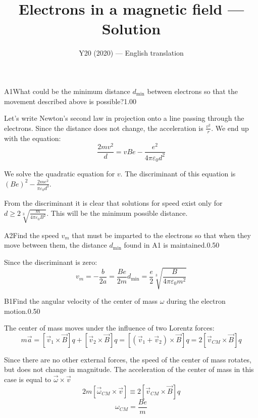 \documentclass[11pt,a4paper]{article}
\title{\textbf{Electrons in a magnetic field --- Solution}}
\author{\normalsize Y20 (2020) — English translation}
\date{}
\begin{document}
\maketitle\vspace{-0.5em}
\begin{solcard}{A1}{What could be the minimum distance $d_{\min}$ between electrons so that the movement described above is possible?}{1.00}

Let's write Newton's second law in projection onto a line passing through the electrons. Since the distance does not change, the acceleration is $\frac{v^2}{r}$. We end up with the equation: $$ \frac{2mv^2}{d}=vBe-\frac{e^2}{4\pi\varepsilon_0 d^2} $$


We solve the quadratic equation for $v$. The discriminant of this equation is $(Be)^2-\frac{2me^2}{\pi\varepsilon_0d^3}$.


From the discriminant it is clear that solutions for speed exist only for $d\geqslant2\sqrt[3]{\frac{m}{4\pi\varepsilon_0 B^2}}$. This will be the minimum possible distance.

\end{solcard}

\begin{solcard}{A2}{Find the speed $v_m$ that must be imparted to the electrons so that when they move between them, the distance $d_{\min}$ found in A1 is maintained.}{0.50}

Since the discriminant is zero: $$v_m = -\frac{b}{2a}= \frac{Be}{2m}d_{\text{min}}=\frac{e}{2}\sqrt[3]{\frac{B}{4\pi\varepsilon_0m^2}}$$

\end{solcard}

\begin{solcard}{B1}{Find the angular velocity of the center of mass $\omega$ during the electron motion.}{0.50}

The center of mass moves under the influence of two Lorentz forces: $$m\vec{a} = \left[\vec{v}_1\times \vec B\right]q+\left[\vec{v}_2\times \vec B\right]q = \left[\left(\vec{v}_1+\vec{v}_2\right)\times \vec B\right]q = 2\left[\vec{v}_{CM}\times \vec B\right]q$$


Since there are no other external forces, the speed of the center of mass rotates, but does not change in magnitude. The acceleration of the center of mass in this case is equal to $\vec\omega\times\vec v$ $$2m\left[\vec\omega_{CM}\times\vec v\right] \equiv 2\left[\vec{v}_{CM}\times \vec B\right]q$$ $$\omega_{CM} = \frac{Be}{m}$$

\end{solcard}
\end{document}
